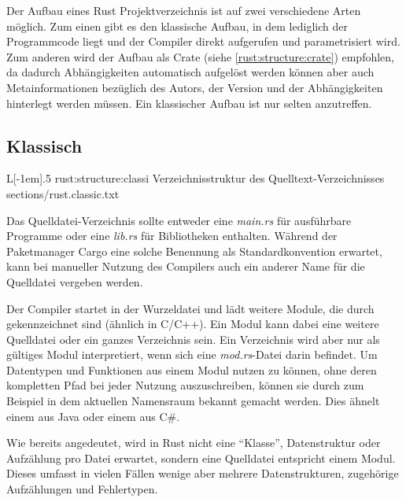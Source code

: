 Der Aufbau eines Rust Projektverzeichnis ist auf zwei verschiedene Arten möglich.
Zum einen gibt es den klassische Aufbau, in dem lediglich der Programmcode liegt und der Compiler direkt aufgerufen und parametrisiert wird.
Zum anderen wird der Aufbau als Crate (siehe \autoref{rust:structure:crate}) empfohlen, da dadurch Abhängigkeiten automatisch aufgelöst werden können aber auch Metainformationen bezüglich des Autors, der Version und der Abhängigkeiten hinterlegt werden müssen.
Ein klassischer Aufbau ist nur selten anzutreffen.


\subsection{Klassisch}
\label{rust:structure:classic}
\begin{wrapfigure}{L}[-1em]{.5\textwidth}
	\rustcinclude
		{rust:structure:classi}
		{Verzeichnisstruktur des Quelltext-Verzeichnisses}
		{sections/rust.classic.txt}
\end{wrapfigure}

Das Quelldatei-Verzeichnis sollte entweder eine \textit{main.rs} für ausführbare Programme oder eine \textit{lib.rs} für Bibliotheken enthalten.
Während der Paketmanager Cargo eine solche Benennung als Standardkonvention erwartet, kann bei manueller Nutzung des Compilers auch ein anderer Name für die Quelldatei vergeben werden.

Der Compiler startet in der Wurzeldatei und lädt weitere Module, die durch  gekennzeichnet sind (ähnlich  in C/C++).
Ein Modul kann dabei eine weitere Quelldatei oder ein ganzes Verzeichnis sein.
Ein Verzeichnis wird aber nur als gültiges Modul interpretiert, wenn sich eine \textit{mod.rs}-Datei darin befindet.
Um Datentypen und Funktionen aus einem Modul nutzen zu können, ohne deren kompletten Pfad bei jeder Nutzung auszuschreiben, können sie durch zum Beispiel  in dem aktuellen Namensraum bekannt gemacht werden.
Dies ähnelt einem  aus Java oder einem  aus C\#.

Wie bereits angedeutet, wird in Rust nicht eine \enquote{Klasse}, Datenstruktur oder Aufzählung pro Datei erwartet, sondern eine Quelldatei entspricht einem Modul.
Dieses umfasst in vielen Fällen wenige aber mehrere Datenstrukturen, zugehörige Aufzählungen und Fehlertypen.

